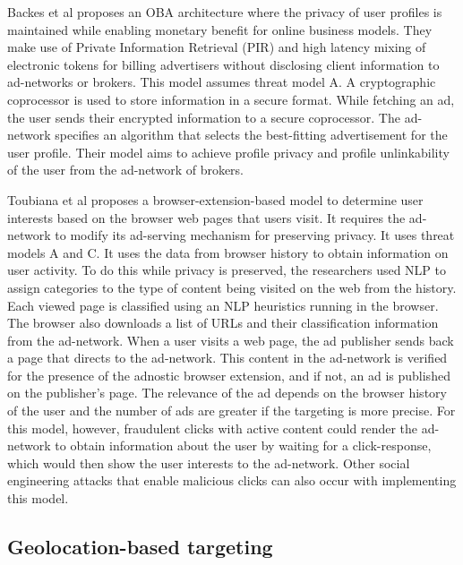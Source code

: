 \documentclass[sigconf,nonacm]{acmart}
\begin{document}
Backes et al \cite{oblivad} proposes an OBA architecture where the privacy of user profiles is maintained while enabling monetary benefit for online business models. They make use of Private Information Retrieval (PIR) and high latency mixing of electronic tokens for billing advertisers without disclosing client information to ad-networks or brokers. This model assumes threat model A. A cryptographic coprocessor is used to store information in a secure format. While fetching an ad, the user sends their encrypted information to a secure coprocessor. The ad-network specifies an algorithm that selects the best-fitting advertisement for the user profile. Their model aims to achieve profile privacy and profile unlinkability of the user from the ad-network of brokers. 

Toubiana et al \cite{Adnostic} proposes a browser-extension-based model to determine user interests based on the browser web pages that users visit. It requires the ad-network to modify its ad-serving mechanism for preserving privacy. It uses threat models A and C. It uses the data from browser history to obtain information on user activity. To do this while privacy is preserved, the researchers used NLP to assign categories to the type of content being visited on the web from the history. Each viewed page is classified using an NLP heuristics running in the browser. The browser also downloads a list of URLs and their classification information from the ad-network. When a user visits a web page, the ad publisher sends back a page that directs to the ad-network. This content in the ad-network is verified for the presence of the adnostic browser extension, and if not, an ad is published on the publisher’s page. The relevance of the ad depends on the browser history of the user and the number of ads are greater if the targeting is more precise. For this model, however, fraudulent clicks with active content could render the ad-network to obtain information about the user by waiting for a click-response, which would then show the user interests to the ad-network. Other social engineering attacks that enable malicious clicks can also occur with implementing this model.


\subsection{Geolocation-based targeting}
\end{document}
